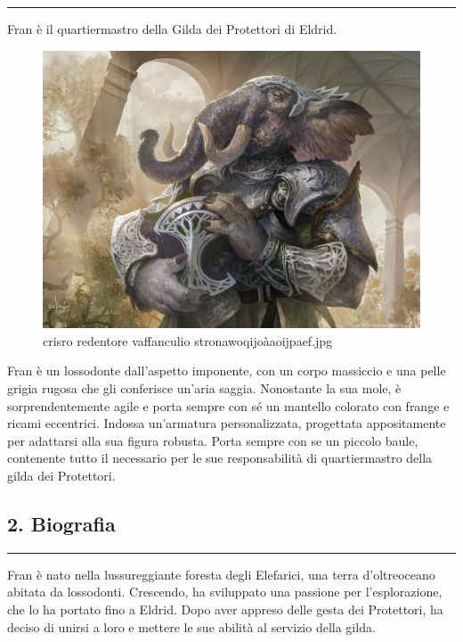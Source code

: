 \begin{center}\rule{0.5\linewidth}{0.5pt}\end{center}

Fran è il quartiermastro della Gilda dei Protettori di Eldrid.

\begin{figure}
\centering
\includegraphics{crisro_redentore_vaffanculio_stronawoqijoaoijpaef 1.jpg}
\caption{crisro redentore vaffanculio stronawoqijoàaoijpaef.jpg}
\end{figure}

Fran è un lossodonte dall'aspetto imponente, con un corpo massiccio e
una pelle grigia rugosa che gli conferisce un'aria saggia. Nonostante la
sua mole, è sorprendentemente agile e porta sempre con sé un mantello
colorato con frange e ricami eccentrici. Indossa un'armatura
personalizzata, progettata appositamente per adattarsi alla sua figura
robusta. Porta sempre con se un piccolo baule, contenente tutto il
necessario per le sue responsabilità di quartiermastro della gilda dei
Protettori.

\subsection{2. Biografia}\label{biografia}

\begin{center}\rule{0.5\linewidth}{0.5pt}\end{center}

Fran è nato nella lussureggiante foresta degli Elefarici, una terra
d'oltreoceano abitata da lossodonti. Crescendo, ha sviluppato una
passione per l'esplorazione, che lo ha portato fino a Eldrid. Dopo aver
appreso delle gesta dei Protettori, ha deciso di unirsi a loro e mettere
le sue abilità al servizio della gilda.

